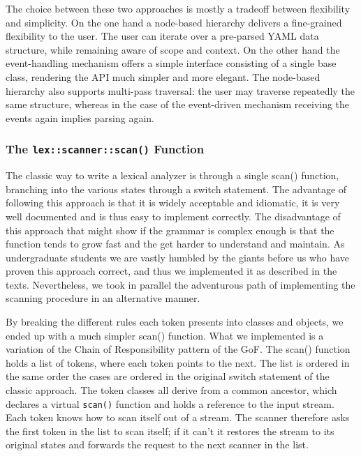 \documentclass{article}
\begin{document}
The choice between these two approaches is mostly a tradeoff between 
flexibility and simplicity.  On the one hand a node-based hierarchy delivers a 
fine-grained flexibility to the user.  The user can iterate over a pre-parsed 
YAML data structure, while remaining aware of scope and context.  On the other 
hand the event-handling mechanism offers a simple interface consisting of a 
single base class, rendering the API much simpler and more elegant.  The 
node-based hierarchy also supports multi-pass traversal:  the user may traverse 
repeatedly the same structure, whereas in the case of the event-driven 
mechanism receiving the events again implies parsing again.

\subsubsection{The \texttt{lex::scanner::scan()} Function}
\label{scan_function}
The classic way to write a lexical analyzer is through a single scan() 
function, branching into the various states through a switch statement.  The 
advantage of following this approach is that it is widely acceptable and 
idiomatic, it is very well documented and is thus easy to implement correctly.  
The disadvantage of this approach that might show if the grammar is complex 
enough is that the function tends to grow fast and the get harder to understand 
and maintain.  As undergraduate students we are vastly humbled by the giants 
before us who have proven this approach correct, and thus we implemented it as 
described in the texts.  Nevertheless, we took in parallel the adventurous path 
of implementing the scanning procedure in an alternative manner.

By breaking the different rules each token presents into classes and objects, 
we ended up with a much simpler scan() function.  What we implemented is a 
variation of the Chain of Responsibility pattern of the GoF.  The scan() 
function holds a list of tokens, where each token points to the next.  The list 
is ordered in the same order the cases are ordered in the original switch 
statement of the classic approach.  The token classes all derive from a common 
ancestor, which declares a virtual \texttt{scan()} function and holds a reference to the 
input stream.  Each token knows how to scan itself out of a stream.  The 
scanner therefore asks the first token in the list to scan itself;  if it can't 
it restores the stream to its original states and forwards the request to the 
next scanner in the list.
\end{document}
